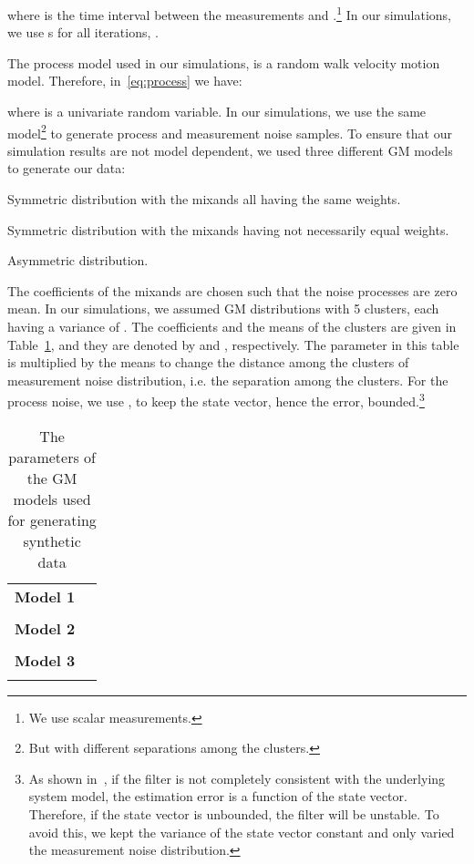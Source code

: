 \documentclass[10pt,twocolumn,twoside]{IEEEtran}
\begin{document}
where  is the time interval between the measurements  and .\footnote{We use scalar measurements.} In our simulations, we use  s for all iterations, .

The process model used in our simulations, is a random walk velocity motion model. Therefore, in~\eqref{eq:process} we have:

where  is a univariate random variable. In our simulations, we use the same model\footnote{But with different separations among the clusters.} to generate process and measurement noise samples. To ensure that our simulation results are not model dependent, we used three different GM models to generate our data:
\begin{itemize}
{\setlength\itemindent{35pt}\item[\textbf{Model 1:}] Symmetric distribution with the mixands all having the same weights.}
{\setlength\itemindent{35pt}\item[\textbf{Model 2:}] Symmetric distribution with the mixands having not necessarily equal weights.}
{\setlength\itemindent{35pt}\item[\textbf{Model 3:}] Asymmetric distribution.}
\end{itemize}
The coefficients of the mixands are chosen such that the noise processes are zero mean. In our simulations, we assumed GM distributions with 5 clusters, each having a variance of . The coefficients and the means of the clusters are given in Table~\ref{tab:GMModelsparams}, and they are denoted by  and , respectively. The parameter  in this table is multiplied by the means to change the distance among the clusters of measurement noise distribution, i.e. the separation among the clusters. For the process noise, we use , to keep the state vector, hence the error, bounded.\footnote{As shown in~\cite{bar2001estimation}, if the filter is not completely consistent with the underlying system model, the estimation error is a function of the state vector. Therefore, if the state vector is unbounded, the filter will be unstable. To avoid this, we kept the variance of the state vector constant and only varied the measurement noise distribution.}
\begin{table}[!t]
\centering
\caption{The parameters of the GM models used for generating synthetic data}
\label{tab:GMModelsparams}
\begin{tabular}{c l}
\hline
\textbf{Model 1} &  \\
&  \\
\hline
\textbf{Model 2} &  \\
&  \\
\hline
\textbf{Model 3} &  \\
&  \\
\hline
\end{tabular}
\end{table}
\end{document}
